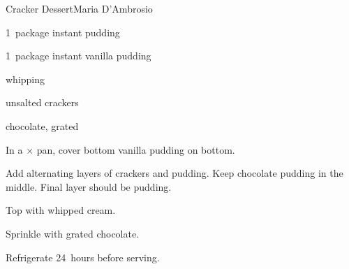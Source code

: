 \begin{recipe}{Cracker Dessert}{Maria D'Ambrosio}{}

\begin{ingredients}
\item 1~package instant  pudding
\item 1~package instant vanilla pudding
\item {} whipping 
\item unsalted crackers
\item chocolate, grated 
\end{ingredients}

\begin{directions}
\item In a $\times$ pan, cover bottom vanilla pudding on bottom.
\item Add alternating layers of crackers and pudding. Keep chocolate pudding in the middle. Final layer should be pudding.
\item Top with whipped cream.
\item Sprinkle with grated chocolate.
\item Refrigerate 24~hours before serving.
\end{directions}

\end{recipe}
